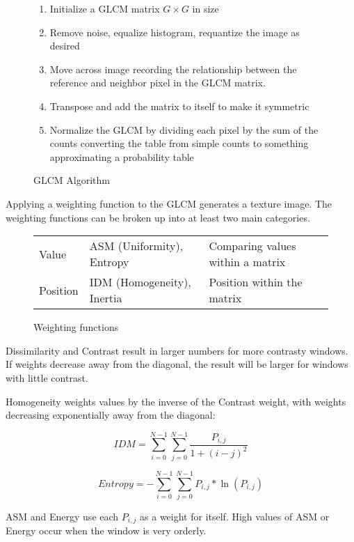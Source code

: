 \documentclass[11pt]{report}
\begin{document}
\begin{figure}[!htb]
	\begin{enumerate}
		\item Initialize a GLCM matrix $G \times G$ in size
		\item Remove noise, equalize histogram, requantize the image as desired
		\item Move across image recording the relationship between the reference and neighbor pixel in the GLCM matrix.
		\item Transpose and add the matrix to itself to make it symmetric
		\item Normalize the GLCM by dividing each pixel by the sum of the counts converting the table from simple counts to something approximating a probability table
	\end{enumerate}
	\caption{GLCM Algorithm}
\end{figure}

Applying a weighting function to the GLCM generates a texture image. The weighting functions can be broken up into at least two main categories.

\begin{figure}[!htb]
	\begin{tabular}{lll}
	Value & ASM (Uniformity), Entropy & Comparing values within a matrix\\
	Position & IDM (Homogeneity), Inertia & Position within the matrix
	\end{tabular}
	\caption{Weighting functions}
\end{figure}

Dissimilarity and Contrast result in larger numbers for more contrasty windows. If weights decrease away from the diagonal, the result will be larger for windows with little contrast.

Homogeneity weights values by the inverse of the Contrast weight, with weights decreasing exponentially away from the diagonal:

\begin{equation}
	IDM = \sum_{i=0}^{N-1}\sum_{j=0}^{N-1}\frac{P_{i,j}}{1+(i-j)^2}
\end{equation}

\begin{equation}
	Entropy = -\sum_{i=0}^{N-1}\sum_{j=0}^{N-1}P_{i,j} * \ln(P_{i,j})
\end{equation}

ASM and Energy use each $P_{i,j}$ as a weight for itself. High values of ASM or Energy occur when the window is very orderly.
\end{document}
